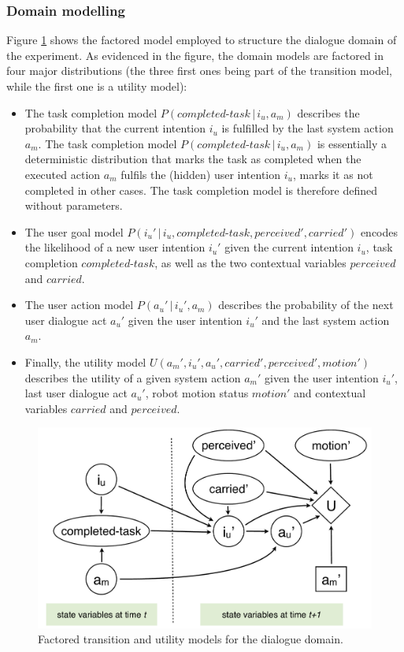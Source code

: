 \subsubsection*{Domain modelling}

Figure \ref{fig:unstructuredmodel-exp3} shows the factored model employed to structure the dialogue domain of the experiment.  As evidenced in the figure, the domain models are factored in four major distributions (the three first ones being part of the transition model, while the first one is a utility model): 
\begin{itemize}
\item The task completion model $P(\mathit{completed\mbox{-}task}\, | \, i_u, a_m)$ describes the probability that the current intention $i_u$ is fulfilled by the last system action $a_m$.  The task completion model $P(\mathit{completed\mbox{-}task}\, | \, i_u, a_m)$ is essentially a deterministic distribution that marks the task as completed when the executed action $a_m$ fulfils the (hidden) user intention $i_u$,  marks it as not completed in other cases. The task completion model is therefore defined without parameters. 
\item The user goal model $P(i_u' \, | \, i_u, \mathit{completed\mbox{-}task}, \mathit{perceived'}, \mathit{carried'})$ encodes the likelihood of a new user intention $i_u'$ given the current intention $i_u$, task completion $\mathit{completed\mbox{-}task}$, as well as the two contextual variables $\mathit{perceived}$ and $\mathit{carried}$. 
\item The user action model $P(a_u'\, | \, i_u', a_m)$ describes the probability of the next user dialogue act $a_u'$ given the user intention $i_u'$ and the last system action $a_m$.
\item Finally, the utility model $U(a_m', i_u', a_u', \mathit{carried'}, \mathit{perceived'}, \mathit{motion'})$ describes the utility of a given system action $a_m'$ given the user intention $i_u'$, last user dialogue act $a_u'$, robot motion status $\mathit{motion'}$ and contextual variables $\mathit{carried}$ and $\mathit{perceived}$. 
\end{itemize}

\begin{figure}[h]
\centering
\includegraphics[scale=0.4]{imgs/unstructuredmodel.pdf} 
\caption{Factored transition and utility models for the dialogue domain.}
\label{fig:unstructuredmodel-exp3}
\end{figure}

